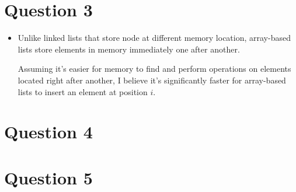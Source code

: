\documentclass[12pt]{article}
\begin{document}
\section*{Question 3}
\begin{itemize}
    \item

    Unlike linked lists that store node at different memory location, array-based
    lists store elements in memory immediately one after another.

    \bigskip

    Assuming it's easier for memory to find and perform operations on elements
    located right after another, I believe it's significantly faster for
    array-based lists to insert an element at position $i$.


\end{itemize}

\section*{Question 4}

\section*{Question 5}
\end{document}
